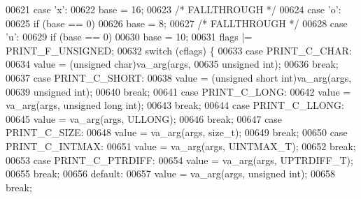 \begin{DoxyCode}
{{00621             \textcolor{keywordflow}{case} \textcolor{charliteral}{'x'}:
00622                 base = 16;
00623                 \textcolor{comment}{/* FALLTHROUGH */}
00624             \textcolor{keywordflow}{case} \textcolor{charliteral}{'o'}:
00625                 \textcolor{keywordflow}{if} (base == 0)
00626                     base = 8;
00627                 \textcolor{comment}{/* FALLTHROUGH */}
00628             \textcolor{keywordflow}{case} \textcolor{charliteral}{'u'}:
00629                 \textcolor{keywordflow}{if} (base == 0)
00630                     base = 10;
00631                 flags |= PRINT\_F\_UNSIGNED;
00632                 \textcolor{keywordflow}{switch} (cflags) \{
00633                 \textcolor{keywordflow}{case} PRINT\_C\_CHAR:
00634                     value = (\textcolor{keywordtype}{unsigned} char)va\_arg(args,
00635                         \textcolor{keywordtype}{unsigned} \textcolor{keywordtype}{int});
00636                     \textcolor{keywordflow}{break};
00637                 \textcolor{keywordflow}{case} PRINT\_C\_SHORT:
00638                     value = (\textcolor{keywordtype}{unsigned} \textcolor{keywordtype}{short} int)va\_arg(args,
00639                         \textcolor{keywordtype}{unsigned} \textcolor{keywordtype}{int});
00640                     \textcolor{keywordflow}{break};
00641                 \textcolor{keywordflow}{case} PRINT\_C\_LONG:
00642                     value = va\_arg(args, \textcolor{keywordtype}{unsigned} \textcolor{keywordtype}{long} \textcolor{keywordtype}{int});
00643                     \textcolor{keywordflow}{break};
00644                 \textcolor{keywordflow}{case} PRINT\_C\_LLONG:
00645                     value = va\_arg(args, ULLONG);
00646                     \textcolor{keywordflow}{break};
00647                 \textcolor{keywordflow}{case} PRINT\_C\_SIZE:
00648                     value = va\_arg(args, \textcolor{keywordtype}{size\_t});
00649                     \textcolor{keywordflow}{break};
00650                 \textcolor{keywordflow}{case} PRINT\_C\_INTMAX:
00651                     value = va\_arg(args, UINTMAX\_T);
00652                     \textcolor{keywordflow}{break};
00653                 \textcolor{keywordflow}{case} PRINT\_C\_PTRDIFF:
00654                     value = va\_arg(args, UPTRDIFF\_T);
00655                     \textcolor{keywordflow}{break};
00656                 \textcolor{keywordflow}{default}:
00657                     value = va\_arg(args, \textcolor{keywordtype}{unsigned} \textcolor{keywordtype}{int});
00658                     \textcolor{keywordflow}{break};
}}
\end{DoxyCode}

